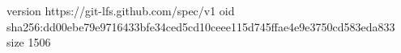 version https://git-lfs.github.com/spec/v1
oid sha256:dd00ebe79e9716433bfe34ced5cd10ceee115d745ffae4e9e3750cd583eda833
size 1506
